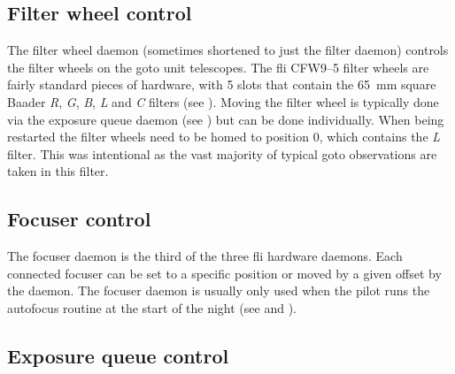 \begin{colsection}
\begin{colsection}
\end{colsection}


\subsection{Filter wheel control}
\label{sec:filt}
\begin{colsection}

The filter wheel daemon (sometimes shortened to just the filter daemon) controls the filter wheels on the \gls{goto} unit telescopes. The \gls{fli} CFW9--5 filter wheels are fairly standard pieces of hardware, with 5 slots that contain the \SI{65}{\milli\metre} square Baader \textit{R}, \textit{G}, \textit{B}, \textit{L} and \textit{C} filters (see ). Moving the filter wheel is typically done via the exposure queue daemon (see ) but can be done individually. When being restarted the filter wheels need to be homed to position 0, which contains the \textit{L} filter. This was intentional as the vast majority of typical \gls{goto} observations are taken in this filter.

\end{colsection}


\subsection{Focuser control}
\label{sec:foc}
\begin{colsection}

The focuser daemon is the third of the three \gls{fli} hardware daemons. Each connected focuser can be set to a specific position or moved by a given offset by the daemon. The focuser daemon is usually only used when the pilot runs the autofocus routine at the start of the night (see  and ).

\end{colsection}


\subsection{Exposure queue control}
\label{sec:exq}
\begin{colsection}


\end{colsection}
\end{colsection}
